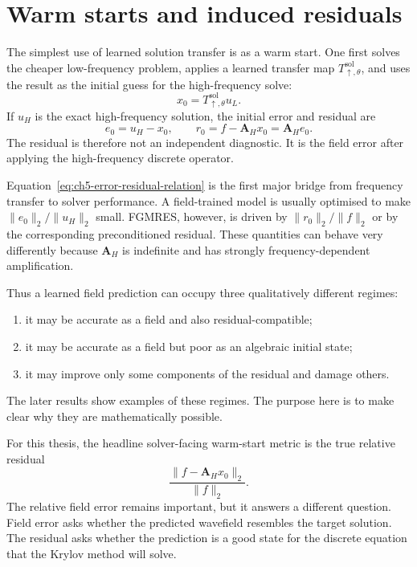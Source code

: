 \section{Warm starts and induced residuals}
\label{sec:ch5-warm-starts}

The simplest use of learned solution transfer is as a warm start. One first
solves the cheaper low-frequency problem, applies a learned transfer map
$T_{\uparrow,\theta}^{\mathrm{sol}}$, and uses the result as the initial guess
for the high-frequency solve:
\begin{equation}
    x_0
    =
    T_{\uparrow,\theta}^{\mathrm{sol}}u_L.
    \label{eq:ch5-warm-start}
\end{equation}
If $u_H$ is the exact high-frequency solution, the initial error and residual
are
\begin{equation}
    e_0
    =
    u_H-x_0,
    \qquad
    r_0
    =
    f-\mathbf{A}_H x_0
    =
    \mathbf{A}_H e_0.
    \label{eq:ch5-error-residual-relation}
\end{equation}
The residual is therefore not an independent diagnostic. It is the field error
after applying the high-frequency discrete operator.

Equation~\eqref{eq:ch5-error-residual-relation} is the first major bridge from
frequency transfer to solver performance. A field-trained model is usually
optimised to make $\|e_0\|_2/\|u_H\|_2$ small. FGMRES, however, is driven by
$\|r_0\|_2/\|f\|_2$ or by the corresponding preconditioned residual. These
quantities can behave very differently because $\mathbf{A}_H$ is indefinite
and has strongly frequency-dependent amplification.

Thus a learned field prediction can occupy three qualitatively different
regimes:
\begin{enumerate}
    \item it may be accurate as a field and also residual-compatible;
    \item it may be accurate as a field but poor as an algebraic initial state;
    \item it may improve only some components of the residual and damage
    others.
\end{enumerate}
The later results show examples of these regimes. The purpose here is to make
clear why they are mathematically possible.

For this thesis, the headline solver-facing warm-start metric is the true
relative residual
\begin{equation}
    \frac{\|f-\mathbf{A}_H x_0\|_2}{\|f\|_2}.
    \label{eq:ch5-true-initial-residual}
\end{equation}
The relative field error remains important, but it answers a different
question. Field error asks whether the predicted wavefield resembles the
target solution. The residual asks whether the prediction is a good state for
the discrete equation that the Krylov method will solve.

